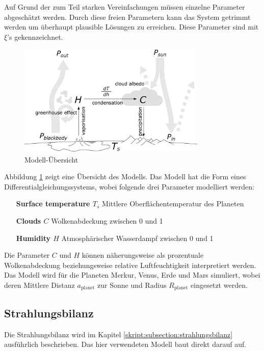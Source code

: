 \begin{refsection}
Auf Grund der zum Teil starken Vereinfachungen müssen einzelne Parameter abgeschätzt werden. Durch diese freien Parametern kann das System getrimmt werden um überhaupt plausible Lösungen zu erreichen. Diese Parameter sind mit $\xi$'s gekennzeichnet.

\begin{figure}
	\centering
	\includegraphics[width=0.8\textwidth]{planeten/Pictures/Model.eps}
	\caption{Modell-Übersicht}
	\label{planeten:model}
\end{figure}
Abbildung \ref{planeten:model} zeigt eine Übersicht des Modells.
Das Modell hat die Form eines Differentialgleichungssystems, wobei folgende drei Parameter modelliert werden:
\begin{itemize}
\item [\textbf{Surface temperature $T_s$}]	Mittlere Oberflächentemperatur des Planeten
\item [\textbf{Clouds $C$}]		Wolkenabdeckung zwischen 0 und 1
\item [\textbf{Humidity $H$}]		Atmosphärischer Wasserdampf zwischen 0 und 1
\end{itemize}
Die Parameter $C$ und $H$ können näherungsweise als prozentuale Wolkenabdeckung beziehungsweise relative Luftfeuchtigkeit  interpretiert werden.
Das Modell wird für die Planeten Merkur, Venus, Erde und Mars simuliert, wobei deren Mittlere Distanz $a_\text{planet}$ zur Sonne und Radius $R_\text{planet}$ eingesetzt werden.

\subsection{Strahlungsbilanz}
Die Strahlungsbilanz wird im Kapitel \ref{skript:subsection:strahlungsbilanz} ausführlich beschrieben. Das hier verwendeten Modell baut direkt darauf auf.


\end{refsection}
